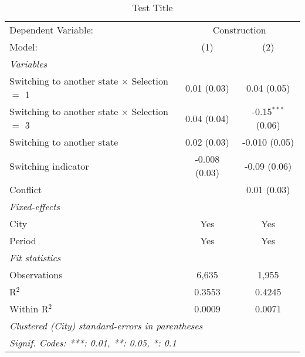 \begin{table}[htbp]
   \caption{Test Title}
   \centering
   \begin{tabular}{lcc}
      \tabularnewline \midrule \midrule
      Dependent Variable: & \multicolumn{2}{c}{Construction}\\
      Model:                                               & (1)           & (2)\\  
      \midrule
      \emph{Variables}\\
      Switching to another state $\times$ Selection $=$ 1  & 0.01 (0.03)   & 0.04 (0.05)\\   
      Switching to another state $\times$ Selection $=$ 3  & 0.04 (0.04)   & -0.15$^{***}$ (0.06)\\   
      Switching to another state                           & 0.02 (0.03)   & -0.010 (0.05)\\   
      Switching indicator                                  & -0.008 (0.03) & -0.09 (0.06)\\   
      Conflict                                             &               & 0.01 (0.03)\\   
      \midrule
      \emph{Fixed-effects}\\
      City                                                 & Yes           & Yes\\  
      Period                                               & Yes           & Yes\\  
      \midrule
      \emph{Fit statistics}\\
      Observations                                         & 6,635         & 1,955\\  
      R$^2$                                                & 0.3553        & 0.4245\\  
      Within R$^2$                                         & 0.0009        & 0.0071\\  
      \midrule \midrule
      \multicolumn{3}{l}{\emph{Clustered (City) standard-errors in parentheses}}\\
      \multicolumn{3}{l}{\emph{Signif. Codes: ***: 0.01, **: 0.05, *: 0.1}}\\
   \end{tabular}
\end{table}
